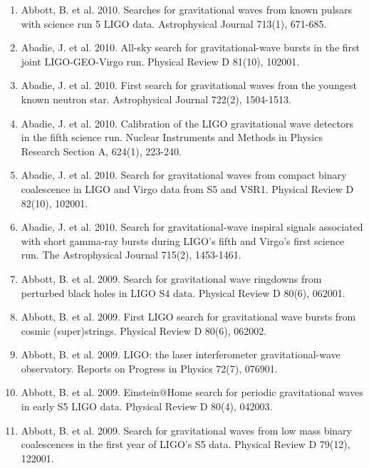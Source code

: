\documentclass[margin,line]{res}
\begin{document}
\begin{resume}
\begin{enumerate}
\item Abbott, B. et al. 2010. Searches for gravitational waves from known pulsars with science run 5 LIGO data. Astrophysical Journal 713(1), 671-685. 

\item Abadie, J. et al. 2010. All-sky search for gravitational-wave bursts in the first joint LIGO-GEO-Virgo run. Physical Review D 81(10), 102001. 

\item Abadie, J. et al. 2010. First search for gravitational waves from the youngest known neutron star. Astrophysical Journal 722(2), 1504-1513. 

\item Abadie, J. et al. 2010. Calibration of the LIGO gravitational wave detectors in the fifth science run. Nuclear Instruments and Methods in Physics Research Section A, 624(1), 223-240. 

\item Abadie, J. et al. 2010. Search for gravitational waves from compact binary coalescence in LIGO and Virgo data from S5 and VSR1. Physical Review D 82(10), 102001. 

\item Abadie, J. et al. 2010. Search for gravitational-wave inspiral signals associated with short gamma-ray bursts during LIGO's fifth and Virgo's first science run. The Astrophysical Journal 715(2), 1453-1461. 

\item Abbott, B. et al. 2009. Search for gravitational wave ringdowns from perturbed black holes in LIGO S4 data. Physical Review D 80(6), 062001. 

\item Abbott, B. et al. 2009. First LIGO search for gravitational wave bursts from cosmic (super)strings. Physical Review D 80(6), 062002. 

\item Abbott, B. et al. 2009. LIGO: the laser interferometer gravitational-wave observatory. Reports on Progress in Physics 72(7), 076901. 

\item Abbott, B. et al. 2009. Einstein@Home search for periodic gravitational waves in early S5 LIGO data. Physical Review D 80(4), 042003. 

\item Abbott, B. et al. 2009. Search for gravitational waves from low mass binary coalescences in the first year of LIGO's S5 data. Physical Review D 79(12), 122001. 


\end{enumerate}
\end{resume}
\end{document}
